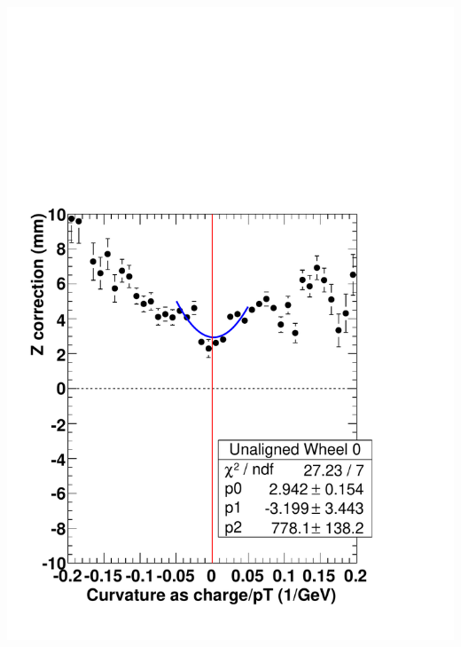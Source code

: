 \documentclass[compress]{beamer}
\begin{document}
\begin{frame}
\begin{columns}
\includegraphics[width=\linewidth]{ZvsCurvature_wh0_unaligned.pdf}

\end{columns}
\end{frame}
\end{document}
